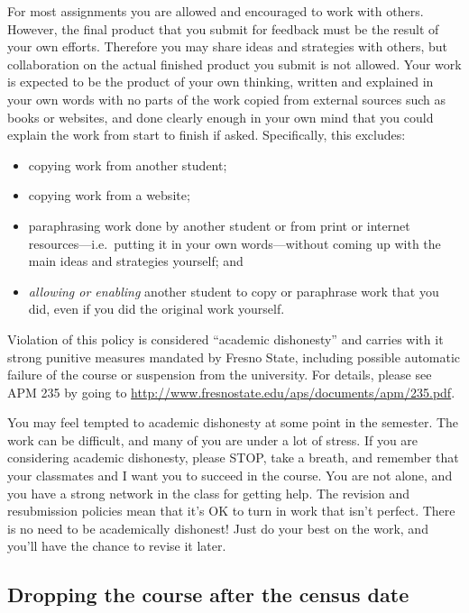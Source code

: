For most assignments you are allowed and encouraged to work with others.
However, the final product that you submit for feedback must be the
result of your own efforts. Therefore you may share ideas and strategies
with others, but collaboration on the actual finished product you submit
is not allowed. Your work is expected to be the product of your own
thinking, written and explained in your own words with no parts of the
work copied from external sources such as books or websites, and done
clearly enough in your own mind that you could explain the work from
start to finish if asked. Specifically, this excludes:

\begin{itemize}
\tightlist
\item
  copying work from another student;
\item
  copying work from a website;
\item
  paraphrasing work done by another student or from print or internet
  resources---i.e.~putting it in your own words---without coming up with
  the main ideas and strategies yourself; and
\item
  \emph{allowing or enabling} another student to copy or paraphrase work
  that you did, even if you did the original work yourself.
\end{itemize}

Violation of this policy is considered ``academic dishonesty'' and
carries with it strong punitive measures mandated by Fresno State,
including possible automatic failure of the course or suspension from
the university. For details, please see APM 235 by going to
\url{http://www.fresnostate.edu/aps/documents/apm/235.pdf}.

You may feel tempted to academic dishonesty at some point in the
semester. The work can be difficult, and many of you are under a lot of
stress. If you are considering academic dishonesty, please STOP, take a
breath, and remember that your classmates and I want you to succeed in
the course. You are not alone, and you have a strong network in the
class for getting help. The revision and resubmission policies mean that
it's OK to turn in work that isn't perfect. There is no need to be
academically dishonest! Just do your best on the work, and you'll have
the chance to revise it later.

\hypertarget{dropping-the-course-after-the-census-date}{%
\subsection{Dropping the course after the census
date}\label{dropping-the-course-after-the-census-date}}

